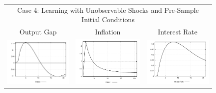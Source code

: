 \begin{figure}
\begin{tabular}{ccc}
\multicolumn{3}{c}{Case 4: Learning with Unobservable Shocks and Pre-Sample Initial Conditions}\\
Output Gap & Inflation & Interest Rate \\ 
\includegraphics[scale=0.28]{results_wlsinit/Output_costshock_irf.png} & 
\includegraphics[scale=0.28]{results_wlsinit/Inflation_costshock_irf.png} & 
\includegraphics[scale=0.28]{results_wlsinit/Interest_Rate_costshock_irf.png} \\ 
\end{tabular}
\end{figure}
